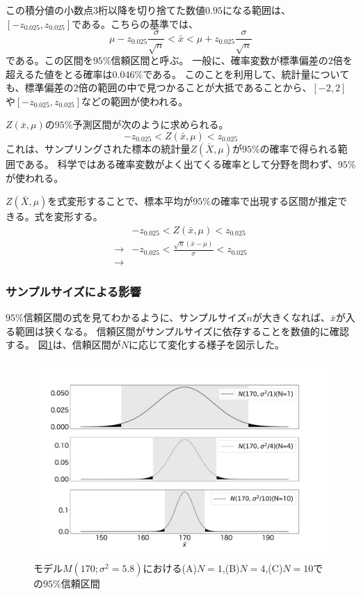 この積分値の小数点$3$桁以降を切り捨てた数値$0.95$になる範囲は、$[-z_{0.025},z_{0.025}]$である。こちらの基準では、
\begin{equation*}
    \mu - z_{0.025} \frac{\sigma}{\sqrt{n}} < \bar{x} < \mu + z_{0.025} \frac{\sigma}{\sqrt{n}}
\end{equation*}
である。この区間を$95\%$信頼区間と呼ぶ。
一般に、確率変数が標準偏差の$2$倍を超えるた値をとる確率は$0.046\%$である。
このことを利用して、統計量についても、標準偏差の$2$倍の範囲の中で見つかることが大抵であることから、$[-2,2]$や$[-z_{0.025},z_{0.025}]$などの範囲が使われる。

$Z(\bar{x},\mu)$の$95\%$予測区間が次のように求められる。
$$
-z_{0.025}<Z(\bar{x},\mu)<z_{0.025}
$$
これは、サンプリングされた標本の統計量$Z(\bar{X},\mu)$が$95\%$の確率で得られる範囲である。
科学ではある確率変数がよく出てくる確率として分野を問わず、$95\%$が使われる。

$Z(\bar{X},\mu)$を式変形することで、標本平均が$95\%$の確率で出現する区間が推定できる。式を変形する。
\begin{eqnarray*}
    & -z_{0.025} < Z(\bar{x},\mu)<z_{0.025} \\
\rightarrow & -z_{0.025} < \frac{\sqrt{n}(\bar{x}-\mu)}{\sigma}  <z_{0.025} \\
\rightarrow & 
\end{eqnarray*}
\fi

\subsubsection{サンプルサイズによる影響}
$95\%$信頼区間の式を見てわかるように、サンプルサイズ$n$が大きくなれば、$\bar{x}$が入る範囲は狭くなる。
信頼区間がサンプルサイズに依存することを数値的に確認する。
図\ref{fig:confidence_interval_n}は、信頼区間が$N$に応じて変化する様子を図示した。

\begin{figure}
\begin{center}
    \includegraphics[width=15cm]{./image/03_/confidence_interval.pdf}
    \caption{モデル$M(170;\sigma^2=5.8)$における(A)$N=1$,(B)$N=4$,(C)$N=10$での$95\%$信頼区間}
    \label{fig:confidence_interval_n}
    \end{center}
\end{figure}


